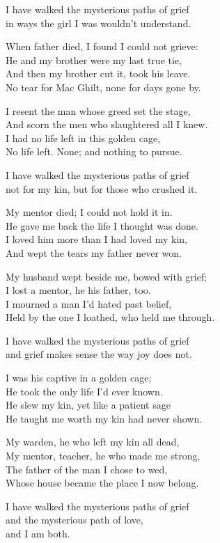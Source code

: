 \begin{lyrics}
I have walked the mysterious paths of grief\\
in ways the girl I was wouldn't understand.

When father died, I found I could not grieve:\\
He and my brother were my last true tie,\\
And then my brother cut it, took his leave.\\
No tear for Mac Ghilt, none for days gone by.

I resent the man whose greed set the stage,\\
And scorn the men who slaughtered all I knew.\\
I had no life left in this golden cage,\\
No life left. None; and nothing to pursue.

I have walked the mysterious paths of grief\\
not for my kin, but for those who crushed it.

My mentor died; I could not hold it in.\\
He gave me back the life I thought was done.\\
I loved him more than I had loved my kin,\\
And wept the tears my father never won.

My husband wept beside me, bowed with grief;\\
I lost a mentor, he his father, too.\\
I mourned a man I’d hated past belief,\\
Held by the one I loathed, who held me through.

I have walked the mysterious paths of grief\\
and grief makes sense the way joy does not.

I was his captive in a golden cage;\\
He took the only life I’d ever known.\\
He slew my kin, yet like a patient sage\\
He taught me worth my kin had never shown.

My warden, he who left my kin all dead,\\
My mentor, teacher, he who made me strong,\\
The father of the man I chose to wed,\\
Whose house became the place I now belong.

I have walked the mysterious paths of grief\\
and the mysterious path of love,\\
and I am both.
\end{lyrics}

